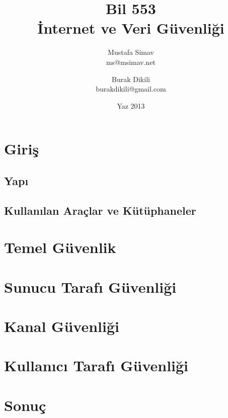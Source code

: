 \documentclass[11pt]{report}
\title{\textbf{Bil 553} \\ İnternet ve Veri Güvenliği}
\author{Mustafa Simav \\
        ms@msimav.net
    \and
        Burak Dikili \\
        burakdikili@gmail.com}
\date{Yaz 2013}
\begin{document}
\maketitle

\chapter{Giriş}

\section{Yapı}
\section{Kullanılan Araçlar ve Kütüphaneler}

\chapter{Temel Güvenlik}

\chapter{Sunucu Tarafı Güvenliği}

\chapter{Kanal Güvenliği}

\chapter{Kullanıcı Tarafı Güvenliği}

\chapter{Sonuç}
\end{document}
